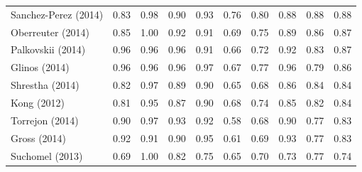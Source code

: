\begin{table}[th]
\begin{tabularx}{.3\textwidth}{@{}l*{9}{X}}
\midrule
Sanchez-Perez (2014)        &         0.83 &   0.98 &    0.90 &       0.93 &   0.76 &    0.80 &      0.88 &   0.88 &    0.88 \\
Oberreuter (2014)           &         0.85 &   1.00 &    0.92 &       0.91 &   0.69 &    0.75 &      0.89 &   0.86 &    0.87 \\
Palkovskii (2014)           &         0.96 &   0.96 &    0.96 &       0.91 &   0.66 &    0.72 &      0.92 &   0.83 &    0.87 \\
Glinos (2014)               &         0.96 &   0.96 &    0.96 &       0.97 &   0.67 &    0.77 &      0.96 &   0.79 &    0.86 \\
Shrestha (2014)             &         0.82 &   0.97 &    0.89 &       0.90 &   0.65 &    0.68 &      0.86 &   0.84 &    0.84 \\
Kong (2012)                 &         0.81 &   0.95 &    0.87 &       0.90 &   0.68 &    0.74 &      0.85 &   0.82 &    0.84 \\
Torrejon (2014)             &         0.90 &   0.97 &    0.93 &       0.92 &   0.58 &    0.68 &      0.90 &   0.77 &    0.83 \\
Gross (2014)                &         0.92 &   0.91 &    0.90 &       0.95 &   0.61 &    0.69 &      0.93 &   0.77 &    0.83 \\
Suchomel (2013)             &         0.69 &   1.00 &    0.82 &       0.75 &   0.65 &    0.70 &      0.73 &   0.77 &    0.74 \\

\end{tabularx}
\end{table}
